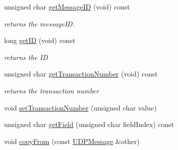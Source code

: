 \begin{DoxyCompactItemize}
\mbox{\label{class_u_d_p_message_a9e762f6c16fa298afe87b9dd6cee41c2}} 
unsigned char \hyperlink{class_u_d_p_message_a9e762f6c16fa298afe87b9dd6cee41c2}{get\+Message\+ID} (void) const
\begin{DoxyCompactList}\small\item\em returns the message\+ID. \end{DoxyCompactList}\item 
\mbox{\label{class_u_d_p_message_add45e9751d72e7d789ed6dcdb06c23d2}} 
long \hyperlink{class_u_d_p_message_add45e9751d72e7d789ed6dcdb06c23d2}{get\+ID} (void) const
\begin{DoxyCompactList}\small\item\em returns the ID \end{DoxyCompactList}\item 
\mbox{\label{class_u_d_p_message_a65fed9ee9c6dc936e1c9d1ae3052d1f7}} 
unsigned char \hyperlink{class_u_d_p_message_a65fed9ee9c6dc936e1c9d1ae3052d1f7}{get\+Transaction\+Number} (void) const
\begin{DoxyCompactList}\small\item\em returns the transaction number \end{DoxyCompactList}\item 
void \hyperlink{class_u_d_p_message_a27629d5cab43160d53cedfd894e1c216}{set\+Transaction\+Number} (unsigned char value)
\item 
unsigned char \hyperlink{class_u_d_p_message_a869585e0916d3b9edf99111f8fc74709}{get\+Field} (unsigned char field\+Index) const
\item 
void \hyperlink{class_u_d_p_message_a313c116a2f7f0f134745ed0c4a759733}{copy\+From} (const \hyperlink{class_u_d_p_message}{U\+D\+P\+Message} \&other)
\end{DoxyCompactItemize}



